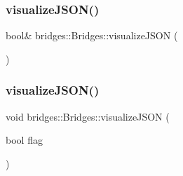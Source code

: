 \subsubsection{\texorpdfstring{visualize\+J\+S\+O\+N()}{visualizeJSON()}\hspace{0.1cm}{\footnotesize\ttfamily [1/2]}}
{\footnotesize\ttfamily bool\& bridges\+::\+Bridges\+::visualize\+J\+S\+ON (\begin{DoxyParamCaption}{ }\end{DoxyParamCaption})}

\mbox{\label{namespacebridges_1_1_bridges_abb0f749a6dbcd0a430504f66de1dbe64}} 
\subsubsection{\texorpdfstring{visualize\+J\+S\+O\+N()}{visualizeJSON()}\hspace{0.1cm}{\footnotesize\ttfamily [2/2]}}
{\footnotesize\ttfamily void bridges\+::\+Bridges\+::visualize\+J\+S\+ON (\begin{DoxyParamCaption}\item[{bool}]{flag }\end{DoxyParamCaption})}

